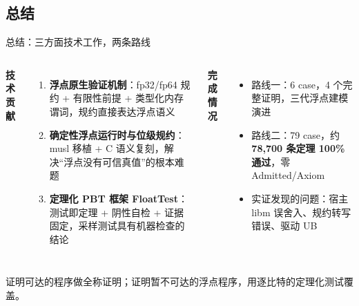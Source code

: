 \documentclass[UTF8,aspectratio=169]{ctexbeamer}
\begin{document}
\subsection{总结}
\begin{frame}{总结：三方面技术工作，两条路线}
  \begin{columns}[T]
    \textbf{技术贡献}
    \begin{enumerate}\small
      \item \textbf{浮点原生验证机制}：fp32/fp64 规约 + 有限性前提 + 类型化内存谓词，规约直接表达浮点语义
      \item \textbf{确定性浮点运行时与位级规约}：musl 移植 + C 语义复刻，解决``浮点没有可信真值''的根本难题
      \item \textbf{定理化 PBT 框架 FloatTest}：测试即定理 + 阴性自检 + 证据固定，采样测试具有机器检查的结论
    \end{enumerate}
    \textbf{完成情况}
    \begin{itemize}\small
      \item 路线一：6 case，4 个完整证明，三代浮点建模演进
      \item 路线二：79 case，约 \textbf{78{,}700 条定理 100\% 通过}，零 Admitted/Axiom
      \item 实证发现的问题：宿主 libm 误舍入、规约转写错误、驱动 UB
    \end{itemize}
  \end{columns}
  \vspace{0.6em}
  \centering\small
  证明可达的程序做全称证明；证明暂不可达的浮点程序，用逐比特的定理化测试覆盖。
\end{frame}
\end{document}
